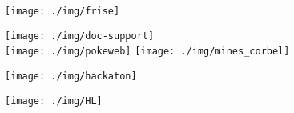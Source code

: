 \documentclass[11pt]{beamer}
\begin{document}
\begin{frame}{}

\texttt{[image: ./img/frise]}

\end{frame}

\begin{frame}{}

\texttt{[image: ./img/doc-support]}\\

\texttt{[image: ./img/pokeweb]}
\texttt{[image: ./img/mines\_corbel]}
\end{frame}


\begin{frame}{}

\texttt{[image: ./img/hackaton]}

\end{frame}

\begin{frame}{}
\begin{center}
\texttt{[image: ./img/HL]}
\end{center}
\end{frame}
\end{document}
